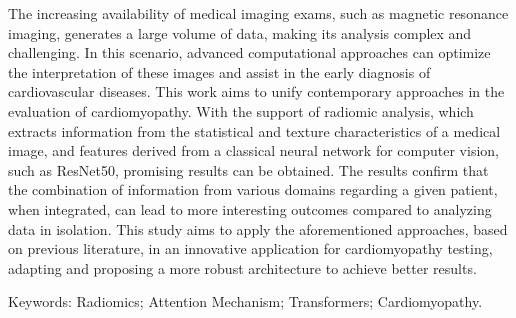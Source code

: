 \begin{resumo}[Abstract]

\setlength{\baselineskip}{1.5\baselineskip} %

The increasing availability of medical imaging exams, such as magnetic resonance imaging, generates a large volume of data, making its analysis complex and challenging. In this scenario, advanced computational approaches can optimize the interpretation of these images and assist in the early diagnosis of cardiovascular diseases. This work aims to unify contemporary approaches in the evaluation of cardiomyopathy. With the support of radiomic analysis, which extracts information from the statistical and texture characteristics of a medical image, and features derived from a classical neural network for computer vision, such as ResNet50, promising results can be obtained. The results confirm that the combination of information from various domains regarding a given patient, when integrated, can lead to more interesting outcomes compared to analyzing data in isolation. This study aims to apply the aforementioned approaches, based on previous literature, in an innovative application for cardiomyopathy testing, adapting and proposing a more robust architecture to achieve better results.

\vspace{\onelineskip}
\noindent 
Keywords: Radiomics; Attention Mechanism; Transformers; Cardiomyopathy.

\end{resumo}
